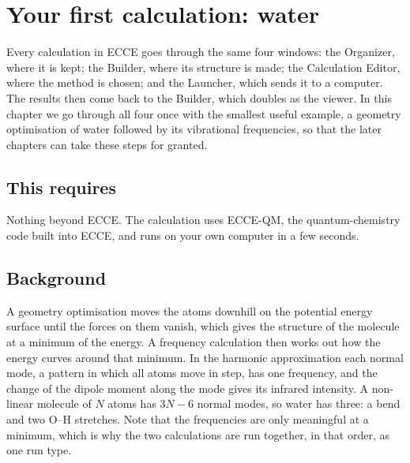 \chapter{Your first calculation: water}
\label{ch:first-calculation}

Every calculation in ECCE goes through the same four windows: the Organizer, where it is kept; the Builder, where its structure is made; the Calculation Editor, where the method is chosen; and the Launcher, which sends it to a computer. The results then come back to the Builder, which doubles as the viewer. In this chapter we go through all four once with the smallest useful example, a geometry optimisation of water followed by its vibrational frequencies, so that the later chapters can take these steps for granted.

\section*{This requires}
Nothing beyond ECCE. The calculation uses ECCE-QM, the quantum-chemistry code built into ECCE, and runs on your own computer in a few seconds.

\section{Background}
A geometry optimisation moves the atoms downhill on the potential energy surface until the forces on them vanish, which gives the structure of the molecule at a minimum of the energy. A frequency calculation then works out how the energy curves around that minimum. In the harmonic approximation each normal mode, a pattern in which all atoms move in step, has one frequency, and the change of the dipole moment along the mode gives its infrared intensity. A non-linear molecule of $N$ atoms has $3N - 6$ normal modes, so water has three: a bend and two O--H stretches. Note that the frequencies are only meaningful at a minimum, which is why the two calculations are run together, in that order, as one run type.

